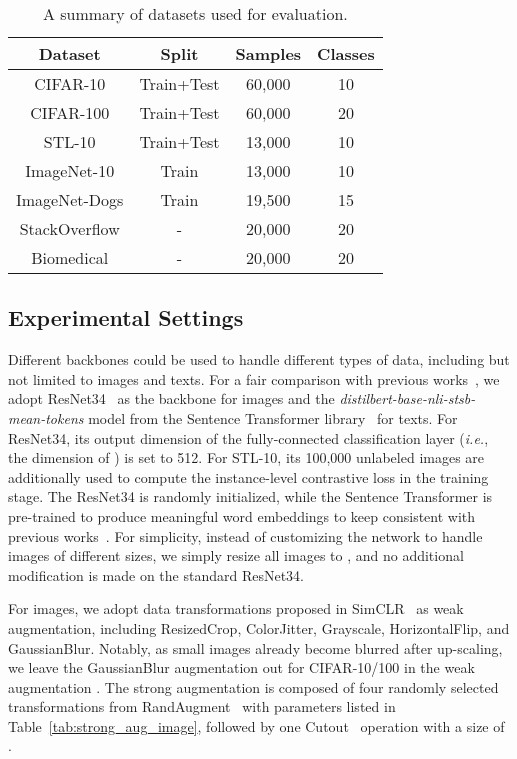 \begin{table}[h]
\centering
\caption{A summary of datasets used for evaluation.}
\begin{tabular}{@{}cccc@{}}
\toprule
Dataset       & Split      & Samples & Classes \\ \midrule
CIFAR-10      & Train+Test & 60,000   & 10      \\
CIFAR-100     & Train+Test & 60,000   & 20      \\
STL-10        & Train+Test & 13,000   & 10      \\
ImageNet-10   & Train      & 13,000   & 10      \\
ImageNet-Dogs & Train      & 19,500   & 15      \\ \midrule
StackOverflow & -          & 20,000    & 20      \\
Biomedical    & -          & 20,000    & 20      \\ \bottomrule
\end{tabular}
\label{tab:datasets}
\end{table}

\subsection{Experimental Settings}

Different backbones could be used to handle different types of data, including but not limited to images and texts. For a fair comparison with previous works~\citep{IIC, PICA, TextCluster}, we adopt ResNet34~\citep{ResNet} as the backbone for images and the \textit{distilbert-base-nli-stsb-mean-tokens} model from the Sentence Transformer library~\citep{SentenceTransformer} for texts. For ResNet34, its output dimension of the fully-connected classification layer (\textit{i.e.}, the dimension of ) is set to 512. For STL-10, its 100,000 unlabeled images are additionally used to compute the instance-level contrastive loss in the training stage. The ResNet34 is randomly initialized, while the Sentence Transformer is pre-trained to produce meaningful word embeddings to keep consistent with previous works~\citep{TextData, TextCluster}. For simplicity, instead of customizing the network to handle images of different sizes, we simply resize all images to , and no additional modification is made on the standard ResNet34.

For images, we adopt data transformations proposed in SimCLR~\citep{SimCLR} as weak augmentation, including ResizedCrop, ColorJitter, Grayscale, HorizontalFlip, and GaussianBlur. Notably, as small images already become blurred after up-scaling, we leave the GaussianBlur augmentation out for CIFAR-10/100 in the weak augmentation . The strong augmentation  is composed of four randomly selected transformations from RandAugment~\citep{RandAug} with parameters listed in Table~\ref{tab:strong_aug_image}, followed by one Cutout~\citep{CutOut} operation with a size of .

